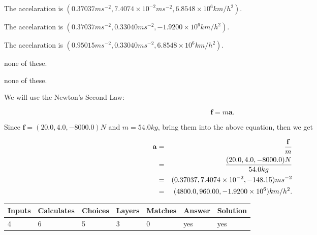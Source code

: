 \documentclass[12pt]{article}
\begin{document}
 
The accelaration is
$(
0.37037ms^{-2},
7.4074 \times 10^{-2}ms^{-2},
6.8548 \times 10^{6}km/h^2
).
$
 
 
The accelaration is
$(
0.37037ms^{-2},
0.33040ms^{-2},
-1.9200 \times 10^{6}km/h^2
).
$
 
 
The accelaration is
$(
0.95015ms^{-2},
0.33040ms^{-2},
6.8548 \times 10^{6}km/h^2
).
$
 
 
none of these.
 
 
\noindent{}
 
 
none of these.
 
 
\noindent{}
 
 
 
 
 
 
\noindent{}
 
 

We will use the Newton's Second Law:
 
\[
\mathbf{f}=m\mathbf{a}.
\]
 
Since $\mathbf{f}=( %
20.0,  %
4.0,  %
-8000.0 )N$
and $m= %
54.0kg$, bring them into the above equation, then we get
 
\begin{eqnarray*}
\mathbf{a}&=&\frac{\mathbf{f}}m  \\
&=&\frac{(
20.0 ,
4.0 ,
-8000.0 )N
}{ %
54.0 kg}  \\
&=&(
0.37037 ,
7.4074 \times 10^{-2},
-148.15
)ms^{-2} \\
&=&(
4800.0 ,
960.00 ,
-1.9200 \times 10^{6}
)km/h^2.
\end{eqnarray*}
 
 
 
\noindent{}
 
 

 
\vspace{0.3in}
   
   
   
   
\noindent\begin{tabular}{|l|l|l|l|l|l|l|}
 \hline
Inputs & Calculates & Choices & Layers & Matches & Answer & Solution \\ \hline
           4  & 
           6  & 
           5
  & 
           3  & 
           0  & 
  yes & 
  yes 
  \\ \hline
 \end{tabular}
   
\end{document}
